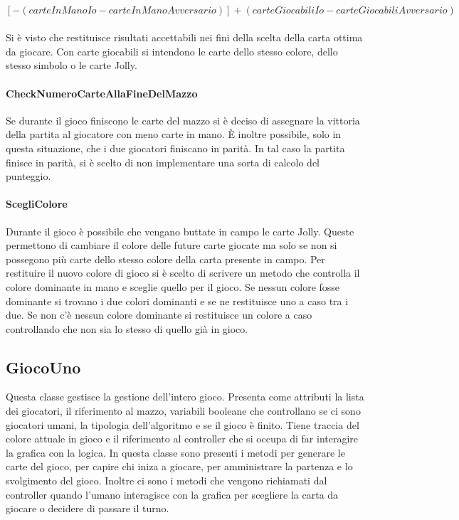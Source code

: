 		$ [- (carteInManoIo - carteInManoAvversario)] + (carteGiocabiliIo - carteGiocabiliAvversario) $\\\\
		
		Si è visto che restituisce risultati accettabili nei fini della scelta della carta ottima da giocare. Con carte giocabili si intendono le carte dello stesso colore, dello stesso simbolo o le carte Jolly. 
		
		\paragraph{CheckNumeroCarteAllaFineDelMazzo}
		Se durante il gioco finiscono le carte del mazzo si è deciso di assegnare la vittoria della partita al giocatore con meno carte in mano. È inoltre possibile, solo in questa situazione, che i due giocatori finiscano in parità. In tal caso la partita finisce in parità, si è scelto di non implementare una sorta di calcolo del punteggio.
		
		\paragraph{ScegliColore}
		Durante il gioco è possibile che vengano buttate in campo le carte Jolly. Queste permettono di cambiare il colore delle future carte giocate ma solo se non si possegono più carte dello stesso colore della carta presente in campo. Per restituire il nuovo colore di gioco si è scelto di scrivere un metodo che controlla il colore dominante in mano e sceglie quello per il gioco. Se nessun colore fosse dominante si trovano i due colori dominanti e se ne restituisce uno a caso tra i due. Se non c'è nessun colore dominante si restituisce un colore a caso controllando che non sia lo stesso di quello già in gioco.
	
	\subsection{GiocoUno}
		Questa classe gestisce la gestione dell'intero gioco. Presenta come attributi la lista dei giocatori, il riferimento al mazzo, variabili booleane che controllano se ci sono giocatori umani, la tipologia dell'algoritmo e se il gioco è finito. Tiene traccia del colore attuale in gioco e il riferimento al controller che si occupa di far interagire la grafica con la logica. In questa classe sono presenti i metodi per generare le carte del gioco, per capire chi iniza a giocare, per amministrare la partenza e lo svolgimento del gioco. Inoltre ci sono i metodi che vengono richiamati dal controller quando l'umano interagisce con la grafica per scegliere la carta da giocare o decidere di passare il turno.
		
